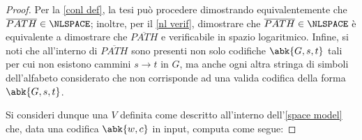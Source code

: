 \documentclass[a4paper, 12pt]{report}
\begin{document}
    \begin{proof}
        Per la \cref{conl def}, la tesi può procedere dimostrando equivalentemente che $\overline{PATH} \in \NLSPACE$; inoltre, per il \cref{nl verif}, dimostrare che $\overline{PATH} \in \NLSPACE$ è equivalente a dimostrare che $\overline{PATH}$ e verificabile in spazio logaritmico. Infine, si noti che all'interno di $\overline{PATH}$ sono presenti non solo codifiche $\abk{G, s, t}$ tali per cui non esistono cammini $s \to t$ in $G$, ma anche ogni altra stringa di simboli dell'alfabeto considerato che non corrisponde ad una valida codifica della forma $\abk{G, s, t}$. 

        Si consideri dunque una \TM $V$ definita come descritto all'interno dell'\cref{space model} che, data una codifica $\abk{w, c}$ in input, computa come segue:


\end{proof}
\end{document}
